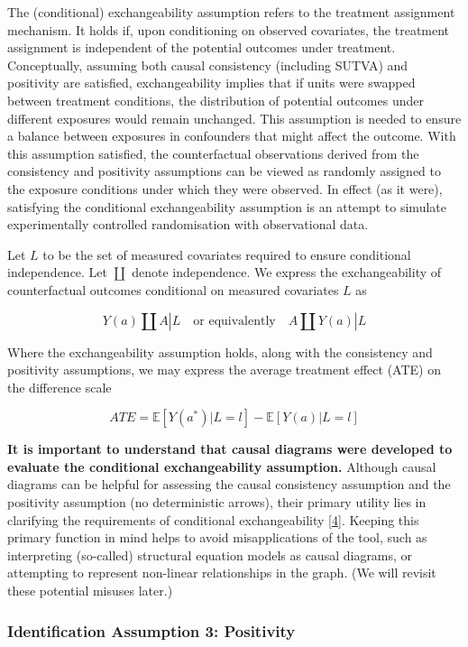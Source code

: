 \documentclass[
  singlecolumn]{article}
\begin{document}
The (conditional) exchangeability assumption refers to the treatment
assignment mechanism. It holds if, upon conditioning on observed
covariates, the treatment assignment is independent of the potential
outcomes under treatment. Conceptually, assuming both causal consistency
(including SUTVA) and positivity are satisfied, exchangeability implies
that if units were swapped between treatment conditions, the
distribution of potential outcomes under different exposures would
remain unchanged. This assumption is needed to ensure a balance between
exposures in confounders that might affect the outcome. With this
assumption satisfied, the counterfactual observations derived from the
consistency and positivity assumptions can be viewed as randomly
assigned to the exposure conditions under which they were observed. In
effect (as it were), satisfying the conditional exchangeability
assumption is an attempt to simulate experimentally controlled
randomisation with observational data.

Let \(L\) to be the set of measured covariates required to ensure
conditional independence. Let \(\coprod\) denote independence. We
express the exchangeability of counterfactual outcomes conditional on
measured covariates \(L\) as

\[
Y(a) \coprod  A|L \quad \text{or equivalently} \quad A \coprod  Y(a)|L
\]

Where the exchangeability assumption holds, along with the consistency
and positivity assumptions, we may express the average treatment effect
(ATE) on the difference scale

\[
ATE = \mathbb{E}[Y(a^*)|L = l] - \mathbb{E}[Y(a)|L = l]
\]

\textbf{It is important to understand that causal diagrams were
developed to evaluate the conditional exchangeability assumption.}
Although causal diagrams can be helpful for assessing the causal
consistency assumption and the positivity assumption (no deterministic
arrows), their primary utility lies in clarifying the requirements of
conditional exchangeability
{[}\protect\hyperlink{ref-hernuxe1n2023}{4}{]}. Keeping this primary
function in mind helps to avoid misapplications of the tool, such as
interpreting (so-called) structural equation models as causal diagrams,
or attempting to represent non-linear relationships in the graph. (We
will revisit these potential misuses later.)

\hypertarget{identification-assumption-3-positivity}{%
\subsubsection{Identification Assumption 3:
Positivity}\label{identification-assumption-3-positivity}}
\end{document}
